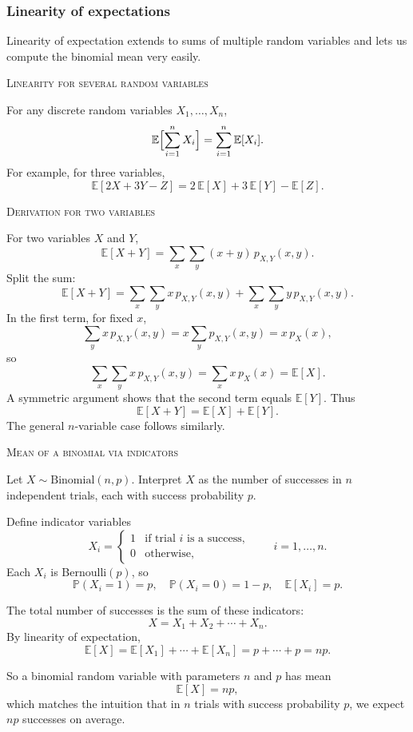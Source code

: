 \subsubsection{Linearity of expectations}

Linearity of expectation extends to sums of multiple random variables and lets us compute the binomial mean very easily.

\bigskip\textsc{Linearity for several random variables}

For any discrete random variables \(X_1,\dots,X_n\),
\[
\mathbb{E}\Bigl[\sum_{i=1}^{n} X_i\Bigr] = \sum_{i=1}^{n} \mathbb{E}[X_i].
\]
For example, for three variables,
\[
\mathbb{E}[2X + 3Y - Z]
= 2\,\mathbb{E}[X] + 3\,\mathbb{E}[Y] - \mathbb{E}[Z].
\]

\bigskip\textsc{Derivation for two variables}

For two variables \(X\) and \(Y\),
\[
\mathbb{E}[X+Y]
= \sum_{x}\sum_{y} (x+y)\,p_{X,Y}(x,y).
\]
Split the sum:
\[
\mathbb{E}[X+Y]
= \sum_{x}\sum_{y} x\,p_{X,Y}(x,y)
+ \sum_{x}\sum_{y} y\,p_{X,Y}(x,y).
\]
In the first term, for fixed \(x\),
\[
\sum_{y} x\,p_{X,Y}(x,y)
= x \sum_{y} p_{X,Y}(x,y)
= x\,p_X(x),
\]
so
\[
\sum_{x}\sum_{y} x\,p_{X,Y}(x,y)
= \sum_{x} x\,p_X(x)
= \mathbb{E}[X].
\]
A symmetric argument shows that the second term equals \(\mathbb{E}[Y]\).  
Thus
\[
\mathbb{E}[X+Y] = \mathbb{E}[X] + \mathbb{E}[Y].
\]
The general \(n\)-variable case follows similarly.

\bigskip\textsc{Mean of a binomial via indicators}

Let \(X \sim \text{Binomial}(n,p)\).  
Interpret \(X\) as the number of successes in \(n\) independent trials, each with success probability \(p\).

Define indicator variables
\[
X_i =
\begin{cases}
1 & \text{if trial \(i\) is a success},\\
0 & \text{otherwise},
\end{cases}
\qquad i=1,\dots,n.
\]
Each \(X_i\) is Bernoulli\((p)\), so
\[
\mathbb{P}(X_i = 1) = p, \quad \mathbb{P}(X_i = 0) = 1-p, \quad \mathbb{E}[X_i] = p.
\]

The total number of successes is the sum of these indicators:
\[
X = X_1 + X_2 + \cdots + X_n.
\]
By linearity of expectation,
\[
\mathbb{E}[X]
= \mathbb{E}[X_1] + \cdots + \mathbb{E}[X_n]
= p + \cdots + p
= np.
\]

So a binomial random variable with parameters \(n\) and \(p\) has mean
\[
\mathbb{E}[X] = np,
\]
which matches the intuition that in \(n\) trials with success probability \(p\), we expect \(np\) successes on average.



